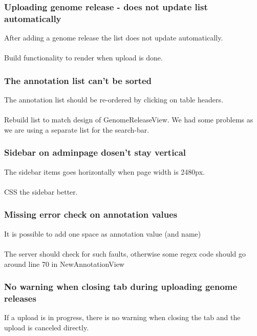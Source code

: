 \subsubsection{Uploading genome release - does not update list automatically}
After adding a genome release the list does not update automatically. \\
\\
Build functionality to render when upload is done. 
\subsubsection{The annotation list can't be sorted}
The annotation list should be re-ordered by clicking on table headers. \\
\\
Rebuild list to match design of GenomeReleaseView. We had some problems as we are using a separate list for the search-bar.
\subsubsection{Sidebar on adminpage dosen't stay vertical}
The sidebar items goes horizontally when page width is 2480px. \\
\\
CSS the sidebar better. 
\subsubsection{Missing error check on annotation values}
It is possible to add one space as annotation value (and name) \\
\\
The server should check for such faults, otherwise some regex code should go around line 70 in NewAnnotationView
\subsubsection{No warning when closing tab during uploading genome releases}
If a upload is in progress, there is no warning when closing the tab and the upload is canceled directly. \\
\\
